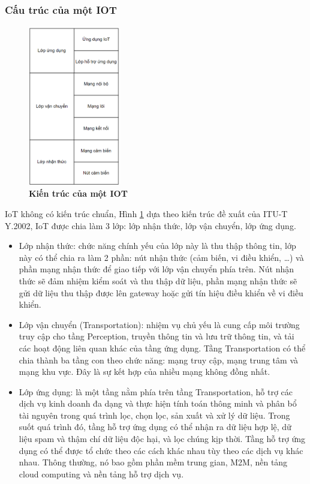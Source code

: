 \documentclass{article} %
\begin{document}
	
	\subsubsection{ Cấu trúc của một IOT}
	
	\begin{figure}[!ht]
		\centering
		\includegraphics[width=4cm,height=7cm]{Images/iotstructure.png}
		\caption[Kiến trúc của một IOT\cite{jing2014security}]{\bfseries \fontsize{12pt}{0pt}\selectfont Kiến trúc của một IOT\cite{jing2014security}}
		\label{iotstructure}
	\end{figure}
	
	IoT không có kiến trúc chuẩn, Hình \ref{iotstructure} dựa theo kiến trúc đề xuất của ITU-T Y.2002, IoT được chia làm 3 lớp: lớp nhận thức, lớp vận chuyển, lớp ứng dụng.
	
	\begin{itemize}
		\item Lớp nhận thức: chức năng chính yếu của lớp này là thu thập thông tin, lớp này có thể chia ra làm 2 phần: nút nhận thức (cảm biến, vi điều khiển, …) và phần mạng nhận thức để giao tiếp với lớp vận chuyển phía trên. Nút nhận thức sẽ đảm nhiệm kiểm soát và thu thập dữ liệu, phần mạng nhận thức sẽ gửi dữ liệu thu thập được lên gateway hoặc gửi tín hiệu điều khiển về vi điều khiển.
		\item Lớp vận chuyển (Transportation): nhiệm vụ chủ yếu là cung cấp môi trường truy cập cho tầng Perception, truyền thông tin và lưu trữ thông tin, và tải các hoạt động liên quan khác của tầng ứng dụng. Tầng Transportation có thể chia thành ba tầng con theo chức năng: mạng truy cập, mạng trung tâm và mạng khu vực. Đây là sự kết hợp của nhiều mạng không đồng nhất.
		\item Lớp ứng dụng: là một tầng nằm phía trên tầng Transportation, hỗ trợ các dịch vụ kinh doanh đa dạng và thực hiện tính toán thông minh và phân bổ tài nguyên trong quá trình lọc, chọn lọc, sản xuất và xử lý dữ liệu. Trong suốt quá trình đó, tầng hỗ trợ ứng dụng có thể nhận ra dữ liệu hợp lệ, dữ liệu spam và thậm chí dữ liệu độc hại, và lọc chúng kịp thời. Tầng hỗ trợ ứng dụng có thể được tổ chức theo các cách khác nhau tùy theo các dịch vụ khác nhau. Thông thường, nó bao gồm phần mềm trung gian, M2M, nền tảng cloud computing và nền tảng hỗ trợ dịch vụ.
		
	\end{itemize}
	
\end{document}

